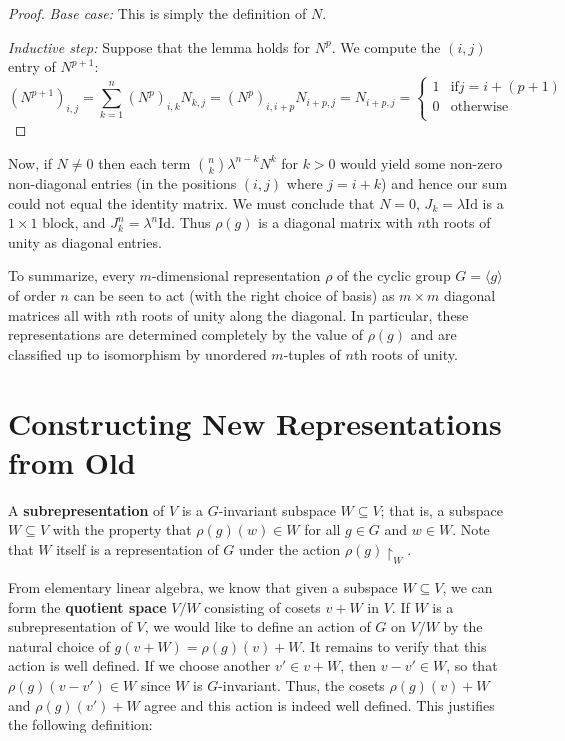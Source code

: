 \begin{example}
\begin{lemma}
\begin{proof}
 {\textit{Base case:}} This is simply the definition of $N$.

 \textit{Inductive step:} Suppose that the lemma holds for $N^p$.  We compute the $(i,j)$ entry of $N^{p+1}$:
\[ (N^{p+1})_{i,j} = \sum_{k=1}^{n} (N^{p})_{i,k} N_{k, j} = (N^p)_{i, i +p} N_{i +p, j} = N_{i +p, j} =\begin{cases} 
      1 & \text{if}  j = i + (p +1) \\
      0 & \text{otherwise} \\
   \end{cases}  \]

\end{proof}
\end{lemma}

Now, if $N \neq 0$ then each term $\binom {n}{k} \lambda ^ {n - k } N ^k$ for $k > 0$ would yield some non-zero non-diagonal entries (in the positions $(i,j)$ where $j= i + k$) and hence our sum could not equal the identity matrix.  We must conclude that $N = 0$, $J_k = \lambda \text{Id}$ is a $1 \times 1$ block, and $J_k ^n = \lambda ^ n \text{Id}$.  Thus $\rho(g)$ is a diagonal matrix with $n$th roots of unity as diagonal entries. 

To summarize, every $m$-dimensional representation $\rho$ of the cyclic group $G = \langle g \rangle$ of order $n$ can be seen to act (with the right choice of basis) as $m \times m$ diagonal matrices all with $n$th roots of unity along the diagonal.  In particular, these representations are determined completely by the value of $\rho(g)$ and are classified up to isomorphism by unordered $m$-tuples of $n$th roots of unity.
\end{example}

\section{Constructing New Representations from Old}
\begin{defn} A \textbf{subrepresentation} of $V$ is a $G$-invariant subspace $W \subseteq V$; that is, a subspace $W \subseteq V$ with the property that $\rho(g) (w) \in W$ for all $g \in G$ and $w \in W$.  Note that $W$ itself is a representation of $G$ under the action $\rho(g) \restriction_W$.
\end{defn}

From elementary linear algebra, we know that given a subspace $W \subseteq V$, we can form the \textbf{quotient space} $V / W$ consisting of cosets $v + W$ in $V$.  If $W$ is a subrepresentation of $V$, we would like to define an action of $G$ on $V / W$ by the natural choice of $g (v + W) = \rho(g)(v)+ W$.  It remains to verify that this action is well defined.  If we choose another $v' \in v + W$, then $v - v' \in W$, so that $\rho(g)(v - v') \in W$ since $W$ is $G$-invariant.  Thus, the cosets $\rho(g)(v) + W$ and $\rho(g)(v') + W$ agree and this action is indeed well defined. This justifies the following definition:

